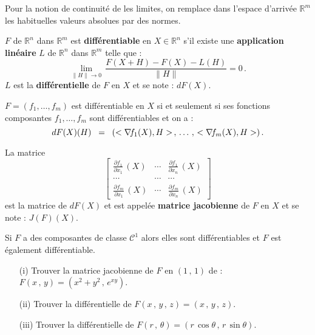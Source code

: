 \documentclass[class=report,crop=false]{standalone}
\begin{document}
{{{{\begin{enumerate}
\end{enumerate}


Pour la notion de continuité de les limites, on remplace dans l'espace d'arrivée $\mathbb{R}^m$  les habituelles valeurs absolues par des normes. 






\begin{definition}
$F$ de $\mathbb{R}^n$ dans $\mathbb{R}^m$ est {\bf différentiable} en $X \in \mathbb{R}^n$ s'il existe une {\bf application linéaire} $L$ de $\mathbb{R}^n$ dans $\mathbb{R}^m$ telle que :
$$
\lim_{\|H\| \rightarrow 0} \, \frac{F(X + H) - F(X) - L (H)}{\|H\|} = 0\, .
$$
$L$ est la {\bf différentielle} de $F$ en $X$ et se note : $dF(X)$.
\end{definition}


\begin{theoreme}
$F=(f_1,\ldots,f_m)$ est différentiable en $X$ si et seulement si ses fonctions composantes $f_1,\ldots,f_m$ sont différentiables et on a :
$$
dF(X) (H) \;\; = \;\; (<\nabla\hspace{-0.6mm} f_{1}(X) , H> \,,\, \dots \,,\, <\nabla\hspace{-0.6mm} f_{m}(X) , H>)\,.
$$
\end{theoreme}


\begin{definition}
La matrice 
$$
\left [ \begin{array}{ccc}
\frac{\partial f_{1}}{\partial x_{1}}\, (X) & \cdots & \frac{\partial f_{1}}{\partial x_{n}}\, (X) \\
\cdots & \cdots & \cdots \\
\frac{\partial f_{m}}{\partial x_{1}}\, (X) & \cdots & \frac{\partial f_{m}}{\partial x_{n}}\, (X)
\end{array}
\right]
$$
est la matrice de $dF(X)$ et est appelée {\bf matrice jacobienne} de $F$ en $X$ et se note : $J(F)(X)$.
\end{definition}

\begin{theoreme}
Si $F$ a des composantes de classe $\mathcal{C}^1$ alors elles sont différentiables et $F$ est également différentiable.
\end{theoreme}


\begin{enumerate}
\item[(i)] Trouver la matrice jacobienne de $F$ en $(1\,,\,1)$ de : $F(x\,,\,y) = (x^2 + y^2 \,,\, e^{xy})$.
\item[(ii)] Trouver la différentielle de $F(x\,,\,y\,,\,z) = (x\,,\,y\,,\,z)$.
\item[(iii)] Trouver la différentielle de $F(r\,,\,\theta) = (r\, \cos \theta \,,\, r\, \sin \theta)$.
\end{enumerate}





}}}}
\end{document}
